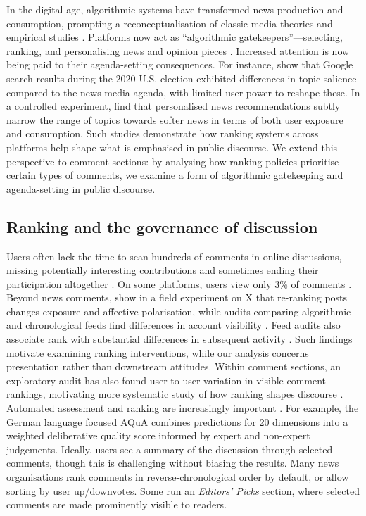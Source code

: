 In the digital age, algorithmic systems have transformed news production and consumption, prompting a reconceptualisation of classic media theories and empirical studies \citep{VanDijck2013, Voinea2025}. Platforms now act as “algorithmic gatekeepers”---selecting, ranking, and personalising news and opinion pieces \citep{Wallace2018}. Increased attention is now being paid to their agenda-setting consequences. For instance, \citet{Trielli2022} show that Google search results during the 2020 U.S. election exhibited differences in topic salience compared to the news media agenda, with limited user power to reshape these. In a controlled experiment, \citet{Einarsson2025} find that personalised news recommendations subtly narrow the range of topics towards softer news in terms of both user exposure and consumption. Such studies demonstrate how ranking systems across platforms help shape what is emphasised in public discourse. We extend this perspective to comment sections: by analysing how ranking policies prioritise certain types of comments, we examine a form of algorithmic gatekeeping and agenda-setting in public discourse.

\subsection{Ranking and the governance of discussion}

Users often lack the time to scan hundreds of comments in online discussions, missing potentially interesting contributions and sometimes ending their participation altogether \citep{Levy2008, Lampe2014}. On some platforms, users view only 3\% of comments \citep{Althuniya2020}.
Beyond news comments, \citet{Piccardi2025} show in a field experiment on X that re-ranking posts changes exposure and affective polarisation, while audits comparing algorithmic and chronological feeds find differences in account visibility \citep{Efstratiou2026}. Feed audits also associate rank with substantial differences in subsequent activity \citep{Chan2026}. Such findings motivate examining ranking interventions, while our analysis concerns presentation rather than downstream attitudes.
Within comment sections, an exploratory audit has also found user-to-user variation in visible comment rankings, motivating more systematic study of how ranking shapes discourse \citep{Nutakki2026}.
Automated assessment and ranking are increasingly important \citep{Momeni2016}. For example, the German language focused AQuA \citep{Behrendt2024} combines predictions for 20 dimensions into a weighted deliberative quality score informed by expert and non-expert judgements. Ideally, users see a summary of the discussion through selected comments, though this is challenging without biasing the results. Many news organisations rank comments in reverse-chronological order by default, or allow sorting by user up/downvotes. Some run an \emph{Editors' Picks} section, where selected comments are made prominently visible to readers. 

